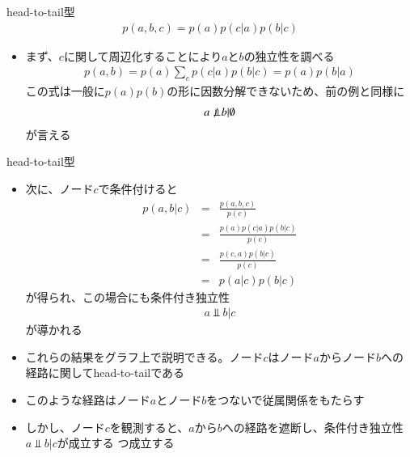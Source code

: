 \begin{frame}{head-to-tail型}
 \begin{eqnarray*}
  p(a,b,c) = p(a)p(c|a)p(b|c)
 \end{eqnarray*}
 \begin{itemize}
  \item まず、$c$に関して周辺化することにより$a$と$b$の独立性を調べる
        \begin{eqnarray*}
         p(a,b) = p(a)\sum_c p(c|a)p(b|c) = p(a)p(b|a)
        \end{eqnarray*}
        この式は一般に$p(a)p(b)$の形に因数分解できないため、前の例と同様に
        \begin{eqnarray*}
         a \nPerp \ b | \emptyset
        \end{eqnarray*}
        が言える
 \end{itemize}
\end{frame}

\begin{frame}{head-to-tail型}
 \begin{itemize}
  \item 次に、ノード$c$で条件付けると
        \begin{eqnarray*}
         p(a,b|c) &=& \frac{p(a,b,c)}{p(c)}\\
         & =& \frac{p(a)p(c|a)p(b|c)}{p(c)}\\
         &= & \frac{p(c,a)p(b|c)}{p(c)}\\
         &= & p(a|c)p(b|c)
        \end{eqnarray*}
        が得られ、この場合にも条件付き独立性
        \begin{eqnarray*}
         a \Perp b | c
        \end{eqnarray*}
        が導かれる
  \item これらの結果をグラフ上で説明できる。ノード$c$はノード$a$からノード$b$への経路に関して\alert{head-to-tail}である
  \item このような経路はノード$a$とノード$b$をつないで従属関係をもたらす
  \item しかし、ノード$c$を観測すると、$a$から$b$への経路を遮断し、条件付き独立性$a \Perp b | c$が成立する つ成立する
 \end{itemize}
\end{frame}

